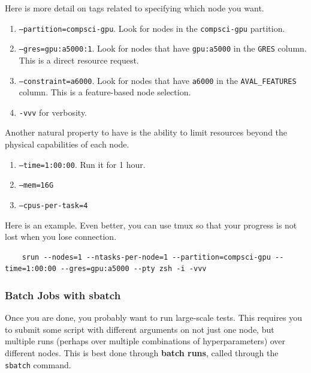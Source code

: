   \begin{definition}
    \label{def:node-specification-options}
    Here is more detail on tags related to specifying which node you want. 
    \begin{enumerate}
      \item \texttt{--partition=compsci-gpu}. Look for nodes in the \texttt{compsci-gpu} partition. 
      \item \texttt{--gres=gpu:a5000:1}. Look for nodes that have \texttt{gpu:a5000} in the \texttt{GRES} column. This is a direct resource request. 
      \item \texttt{--constraint=a6000}. Look for nodes that have \texttt{a6000} in the \texttt{AVAL\_FEATURES} column. This is a feature-based node selection. 
      \item \texttt{-vvv} for verbosity. 
    \end{enumerate} 
  \end{definition} 


  \begin{definition}
    \label{def:constraint-options}
    Another natural property to have is the ability to limit resources beyond the physical capabilities of each node. 
    \begin{enumerate}
      \item \texttt{--time=1:00:00}. Run it for 1 hour.  
      \item \texttt{--mem=16G} 
      \item \texttt{--cpus-per-task=4}
    \end{enumerate}
  \end{definition}

  Here is an example. Even better, you can use tmux so that your progress is not lost when you lose connection. 
  \begin{lstlisting}
    srun --nodes=1 --ntasks-per-node=1 --partition=compsci-gpu --time=1:00:00 --gres=gpu:a5000 --pty zsh -i -vvv
  \end{lstlisting}

\subsubsection{Batch Jobs with sbatch}

  Once you are done, you probably want to run large-scale tests. This requires you to submit some script with different arguments on not just one node, but multiple runs (perhaps over multiple combinations of hyperparameters) over different nodes. This is best done through \textbf{batch runs}, called through the \texttt{sbatch} command. 

